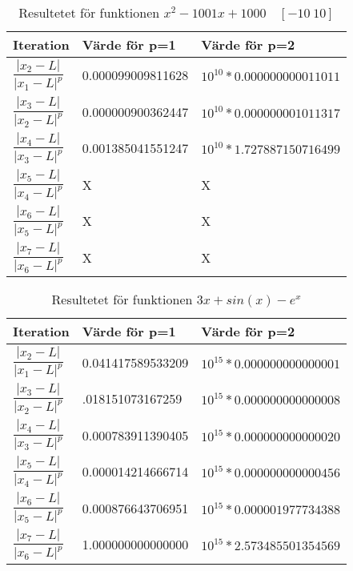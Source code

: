\documentclass[titlepage, a4paper]{article}
\begin{document}
\begin{table}[H]
  \centering
  \begin{tabular}{|l|l|l|}
    \hline
    \textbf{Iteration} & Värde för p=1  & Värde för p=2  \\ \hline
    $\dfrac{|x_{2}-L|}{{|x_1-L|}^p}$ & 0.000099009811628 & $10^{10}*0.000000000011011$ \\ \hline
 
     $\dfrac{|x_{3}-L|}{{|x_2-L|}^p}$ & 0.000000900362447 & $10^{10}*0.000000001011317$ \\ \hline

 $\dfrac{|x_{4}-L|}{{|x_3-L|}^p}$ & 0.001385041551247 & $10^{10}*1.727887150716499$ \\ \hline
 
  $\dfrac{|x_{5}-L|}{{|x_4-L|}^p}$ & X & X \\ \hline

   $\dfrac{|x_{6}-L|}{{|x_5-L|}^p}$ & X & X \\ \hline

    $\dfrac{|x_{7}-L|}{{|x_6-L|}^p}$ & X & X \\ \hline
  \end{tabular}
  \caption{Resultetet för funktionen $x^2-1001x+1000 \quad [-10 \ 10]$ }
  \label{tab:funktion1}
\end{table}

\begin{table}[H]
  \centering
  \begin{tabular}{|l|l|l|}
    \hline
    \textbf{Iteration} & Värde för p=1  & Värde för p=2  \\ \hline
    $\dfrac{|x_{2}-L|}{{|x_1-L|}^p}$ &  0.041417589533209 & $10^{15}*0.000000000000001$ \\ \hline
 
     $\dfrac{|x_{3}-L|}{{|x_2-L|}^p}$ & .018151073167259 & $10^{15}*0.000000000000008$ \\ \hline

 $\dfrac{|x_{4}-L|}{{|x_3-L|}^p}$ & 0.000783911390405 & $10^{15}*0.000000000000020$ \\ \hline
 
  $\dfrac{|x_{5}-L|}{{|x_4-L|}^p}$ & 0.000014214666714 & $10^{15}*0.000000000000456$ \\ \hline

   $\dfrac{|x_{6}-L|}{{|x_5-L|}^p}$ & 0.000876643706951 & $10^{15}*0.000001977734388$ \\ \hline

    $\dfrac{|x_{7}-L|}{{|x_6-L|}^p}$ & 1.000000000000000 & $10^{15}*2.573485501354569
$ \\ \hline
  \end{tabular}
  \caption{Resultetet för funktionen $3x+sin(x)-e^x $}
  \label{tab:funktion2}
\end{table}
\end{document}
